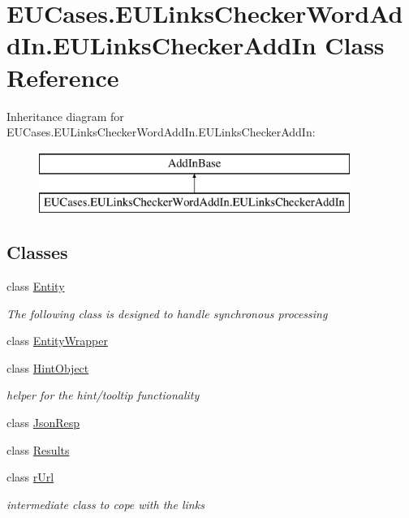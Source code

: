 \hypertarget{class_e_u_cases_1_1_e_u_links_checker_word_add_in_1_1_e_u_links_checker_add_in}{\section{E\+U\+Cases.\+E\+U\+Links\+Checker\+Word\+Add\+In.\+E\+U\+Links\+Checker\+Add\+In Class Reference}
\label{class_e_u_cases_1_1_e_u_links_checker_word_add_in_1_1_e_u_links_checker_add_in}
}
Inheritance diagram for E\+U\+Cases.\+E\+U\+Links\+Checker\+Word\+Add\+In.\+E\+U\+Links\+Checker\+Add\+In\+:\begin{figure}[H]
\begin{center}
\leavevmode
\includegraphics[height=2.000000cm]{class_e_u_cases_1_1_e_u_links_checker_word_add_in_1_1_e_u_links_checker_add_in}
\end{center}
\end{figure}
\subsection*{Classes}
\begin{DoxyCompactItemize}
\item 
class \hyperlink{class_e_u_cases_1_1_e_u_links_checker_word_add_in_1_1_e_u_links_checker_add_in_1_1_entity}{Entity}
\begin{DoxyCompactList}\small\item\em The following class is designed to handle synchronous processing \end{DoxyCompactList}\item 
class \hyperlink{class_e_u_cases_1_1_e_u_links_checker_word_add_in_1_1_e_u_links_checker_add_in_1_1_entity_wrapper}{Entity\+Wrapper}
\item 
class \hyperlink{class_e_u_cases_1_1_e_u_links_checker_word_add_in_1_1_e_u_links_checker_add_in_1_1_hint_object}{Hint\+Object}
\begin{DoxyCompactList}\small\item\em helper for the hint/tooltip functionality \end{DoxyCompactList}\item 
class \hyperlink{class_e_u_cases_1_1_e_u_links_checker_word_add_in_1_1_e_u_links_checker_add_in_1_1_json_resp}{Json\+Resp}
\item 
class \hyperlink{class_e_u_cases_1_1_e_u_links_checker_word_add_in_1_1_e_u_links_checker_add_in_1_1_results}{Results}
\item 
class \hyperlink{class_e_u_cases_1_1_e_u_links_checker_word_add_in_1_1_e_u_links_checker_add_in_1_1r_url}{r\+Url}
\begin{DoxyCompactList}\small\item\em intermediate class to cope with the links \end{DoxyCompactList}\end{DoxyCompactItemize}
